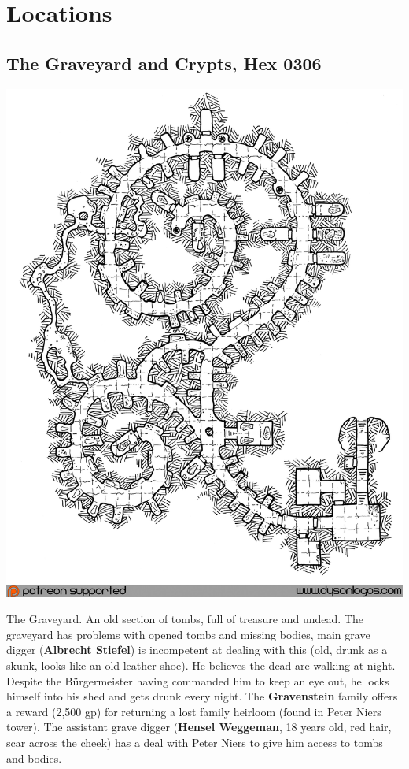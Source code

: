 \documentclass[
]{book}
\begin{document}
\section{Locations}\label{locations}

\subsection{\texorpdfstring{The Graveyard and Crypts, \textbf{Hex 0306}}{The Graveyard and Crypts, Hex 0306}}\label{the-graveyard-and-crypts-hex-0306}

\begin{center}\includegraphics[width=1\linewidth]{graphics/the-spiral-crypts-patreon} \end{center}

The Graveyard. An old section of tombs, full of treasure and undead. The graveyard has problems with opened tombs and missing bodies, main grave digger (\textbf{Albrecht Stiefel}) is incompetent at dealing with this (old, drunk as a skunk, looks like an old leather shoe). He believes the dead are walking at night. Despite the Bürgermeister having commanded him to keep an eye out, he locks himself into his shed and gets drunk every night. The \textbf{Gravenstein} family offers a reward (2,500 gp) for returning a lost family heirloom (found in Peter Niers tower). The assistant grave digger (\textbf{Hensel Weggeman}, 18 years old, red hair, scar across the cheek) has a deal with Peter Niers to give him access to tombs and bodies.
\end{document}
